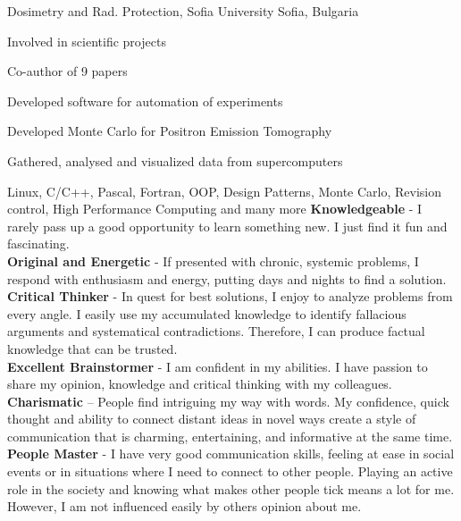 {Dosimetry and Rad. Protection, Sofia University} {Sofia, Bulgaria}
{
 \item Involved in scientific projects 
 \item Co-author of 9 papers
 \item Developed software for automation of experiments
}
{ 
 \item Developed Monte Carlo for Positron Emission Tomography
 \item Gathered, analysed and visualized data from supercomputers
}
{Linux, C/C++, Pascal, Fortran, OOP, Design Patterns, Monte Carlo, Revision control, High Performance Computing and many more}
\vspace{-0.8cm}
\small
\textbf{Knowledgeable} - I rarely pass up a good opportunity to learn something
new. I just find it fun and fascinating.\\
\textbf{Original and Energetic} - If presented with chronic, systemic
problems, I respond with enthusiasm and energy, putting days and nights to find a solution.\\
\textbf{Critical Thinker} - In quest for best solutions, I enjoy to analyze problems from every angle. I easily use my accumulated knowledge to identify fallacious arguments and systematical contradictions. Therefore, I can produce factual knowledge that can be trusted.\\
\textbf{Excellent Brainstormer} - I am confident in my abilities. I
have passion to share my opinion, knowledge and critical thinking with my colleagues.\\
\textbf{Charismatic} – People find intriguing my way with words. My confidence, quick thought and ability to connect distant ideas in novel ways create a style of communication that is charming, entertaining, and informative at the same time.\\
\textbf{People Master} - I have very good communication skills, feeling at ease in social events or in situations where I need to connect to other people. Playing an active role in the society and knowing what makes other people tick means a lot for me. However, I am not influenced easily by others opinion about me.


